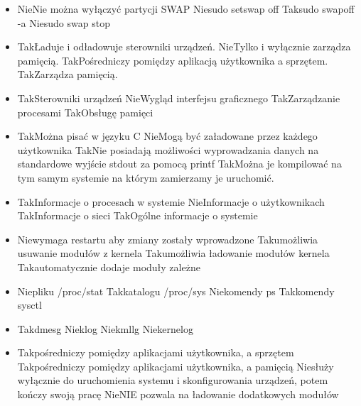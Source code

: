 \begin{itemize}
	\item {}
	{Nie}{Nie można wyłączyć partycji SWAP}
	{Nie}{sudo setswap off}
	{Tak}{sudo swapoff -a}
	{Nie}{sudo swap stop}
	
	\item {}
	{Tak}{Ładuje i odładowuje sterowniki urządzeń.}
	{Nie}{Tylko i wyłącznie zarządza pamięcią.}
	{Tak}{Pośredniczy pomiędzy aplikacją użytkownika a sprzętem.}
	{Tak}{Zarządza pamięcią.}
	
	\item {}
	{Tak}{Sterowniki urządzeń}
	{Nie}{Wygląd interfejsu graficznego}
	{Tak}{Zarządzanie procesami}
	{Tak}{Obsługę pamięci}
	
	\item {}
	{Tak}{Można pisać w języku C}
	{Nie}{Mogą być załadowane przez każdego użytkownika}
	{Tak}{Nie posiadają możliwości wyprowadzania danych na standardowe wyjście stdout za pomocą printf}
	{Tak}{Można je kompilować na tym samym systemie na którym zamierzamy je uruchomić.}
	
	\item {}
	{Tak}{Informacje o procesach w systemie}
	{Nie}{Informacje o użytkownikach}
	{Tak}{Informacje o sieci}
	{Tak}{Ogólne informacje o systemie}
	
	\item {}
	{Nie}{wymaga restartu aby zmiany zostały wprowadzone}
	{Tak}{umożliwia usuwanie modułów z kernela}
	{Tak}{umożliwia ładowanie modułów kernela}
	{Tak}{automatycznie dodaje moduły zależne}
	
	\item {}
	{Nie}{pliku /proc/stat}
	{Tak}{katalogu /proc/sys}
	{Nie}{komendy ps}
	{Tak}{komendy sysctl}
	
	\item {}
	{Tak}{dmesg}
	{Nie}{klog}
	{Nie}{kmllg}
	{Nie}{kernelog}
	
	\newpage
	\item {}%
	{Tak}{pośredniczy pomiędzy aplikacjami użytkownika, a sprzętem}%
	{Tak}{pośredniczy pomiędzy aplikacjami użytkownika, a pamięcią}%
	{Nie}{służy wyłącznie do uruchomienia systemu i skonfigurowania urządzeń, potem kończy swoją pracę}%
	{Nie}{NIE pozwala na ładowanie dodatkowych modułów}
	

\end{itemize}
